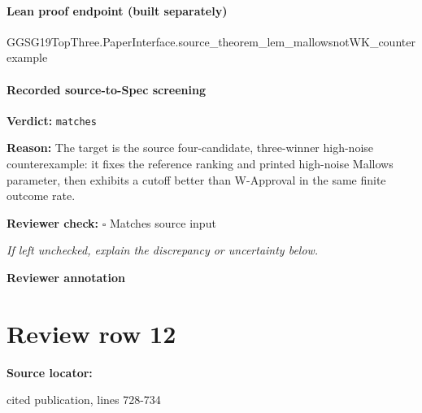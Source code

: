 \documentclass[10pt]{article}
\newcommand{\reviewerbox}{%
  \par\noindent\fbox{\parbox{0.96\linewidth}{\rule{0pt}{0.38in}}}\par
}
\newcommand{\reviewmatch}[1]{%
  \par\noindent\textbf{Reviewer check:} $\square$\; #1\par
  \noindent\emph{If left unchecked, explain the discrepancy or uncertainty below.}\par
}
\begin{document}
\paragraph{Lean proof endpoint (built separately)}\begin{ReviewVerbatim}
GGSG19TopThree.PaperInterface.source_theorem_lem_mallowsnotWK_counterexample
\end{ReviewVerbatim}

\paragraph{Recorded source-to-Spec screening}
\textbf{Verdict:} \texttt{matches}
\\
{\raggedright
\textbf{Reason:} The target is the source four-\allowbreak{}candidate, three-\allowbreak{}winner high-\allowbreak{}noise counterexample:\allowbreak{} it fixes the reference ranking and printed high-\allowbreak{}noise Mallows parameter, then exhibits a cutoff better than W-\allowbreak{}Approval in the same finite outcome rate.\allowbreak{}
\par}
\reviewmatch{Matches source input}
\noindent\textbf{Reviewer annotation}\par
\reviewerbox
\clearpage
\hypertarget{source-claim-183efad42b03de32}{}
\section*{Review row 12}
\textbf{Source locator:} {\footnotesize\raggedright cited publication, lines 728-\allowbreak{}734\par}
\end{document}
